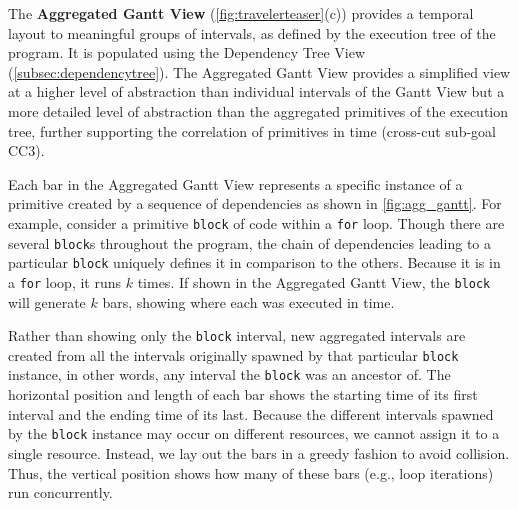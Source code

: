 \begin{refsection}

The \textbf{Aggregated Gantt View} (\autoref{fig:travelerteaser}(c)) provides a temporal layout to meaningful groups of intervals, as defined by the execution tree of the program. It is populated using the Dependency Tree View (\autoref{subsec:dependencytree}). The Aggregated Gantt View provides a simplified view at a higher level of abstraction than individual intervals of the Gantt View but a more detailed level of abstraction than the aggregated primitives of the execution tree, further supporting the correlation of primitives in time (cross-cut sub-goal CC3).


Each bar in the Aggregated Gantt View represents a specific instance of a primitive created by a sequence of dependencies as shown in \autoref{fig:agg_gantt}. For example, consider a primitive \texttt{block} of code within a \texttt{for} loop. Though there are several \texttt{block}s throughout the program, the chain of dependencies leading to a particular \texttt{block} uniquely defines it in comparison to the others. Because it is in a \texttt{for} loop, it runs $k$ times. If shown in the Aggregated Gantt View, the \texttt{block} will generate $k$ bars, showing where each was executed in time. 

Rather than showing only the \texttt{block} interval, new aggregated intervals are created from all the intervals originally spawned by that particular \texttt{block} instance, in other words, any interval the \texttt{block} was an ancestor of. The horizontal position and length of each bar shows the starting time of its first interval and the ending time of its last. Because the different intervals spawned by the \texttt{block} instance may occur on different resources, we cannot assign it to a single resource. Instead, we lay out the bars in a greedy fashion to avoid collision. Thus, the vertical position shows how many of these bars (e.g., loop iterations) run concurrently. 


\end{refsection}
